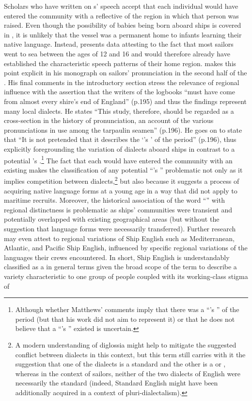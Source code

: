 {Scholars who have written on s’ speech accept that each individual  would have entered the community with a  reflective of the region in which that person was raised.} Even though the possibility of babies being born aboard ships is covered in ,  it is unlikely that the vessel was a permanent home to infants learning their native language. Instead,  presents data attesting to the fact that most sailors went to sea between the ages of 12 and 16 and would therefore already have established the characteristic speech patterns of their home region. \citeauthor{Matthews1935} makes this point explicit in his monograph on sailors’ pronunciation in the second half of the . His final comments in the introductory section stress the relevance of regional influence with the assertion that the writers of the logbooks “must have come from almost every shire’s end of England” (p.195) and thus the findings represent many local dialects. He states “This study, therefore, should be regarded as a cross-section in the history of pronunciation, an account of the various pronunciations in use among the tarpaulin seamen” (p.196). He goes on to state that “It is not pretended that it describes the ‘’s ’ of the period” (p.196), thus explicitly foregrounding the variation of dialects aboard ships in contrast to a potential ’s .\footnote{Although whether Matthews’ comments imply that there was a “’s ” of the period (but that his work did not aim to represent it) or that he does not believe that a “’s ” existed is uncertain.}  The fact that each  would have entered the community with an existing  makes the classification of any potential “’s ” problematic not only as it implies competition between dialects,\footnote{A modern understanding of diglossia might help to mitigate the suggested conflict between dialects in this context, but this term still carries with it the suggestion that one of the dialects is a standard and the other is a  or , whereas in the context of sailors, neither of the two dialects of English were necessarily the standard (indeed, Standard English might have been additionally acquired in a context of pluri-dialectalism).}  but also because it suggests a process of acquiring native language forms at a young age in a way that did not apply to maritime recruits. Moreover, the historical association of the word “” with regional distinctness is problematic as ships’ communities were transient and potentially overlapped with existing geographical  areas (but without the suggestion that language forms were necessarily transferred). Further research may even attest to regional variations of Ship English such as Mediterranean, Atlantic, and Pacific Ship English, influenced by specific regional variations of the languages their crews encountered. In short, Ship English is understandably classified as a  in general terms given the broad scope of the term to describe a variety characteristic to one group of people coupled with its working-class stigma of 